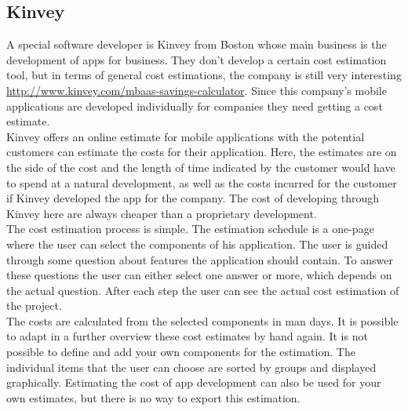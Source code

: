 \subsection{Kinvey}

A special software developer is Kinvey from Boston whose main business is the development of apps for business. They don't develop a certain cost estimation tool, but in terms of general cost estimations, the company is still very interesting \url{http://www.kinvey.com/mbaas-savings-calculator}. Since this company's mobile applications are developed individually for companies they need getting a cost estimate.
\\
Kinvey offers an online estimate for mobile applications with the potential customers can estimate the costs for their application. Here, the estimates are on the side of the cost and the length of time indicated by the customer would have to spend at a natural development, as well as the costs incurred for the customer if Kinvey developed the app for the company. The cost of developing through Kinvey here are always cheaper than a proprietary development.
\\
The cost estimation process is simple. The estimation schedule is a one-page where the user can select the components of his application. The user is guided through some question about features the application should contain. To answer these questions the user can either select one answer or more, which depends on the actual question. After each step the user can see the actual cost estimation of the project.
\\
The costs are calculated from the selected components in man days. It is possible to adapt in a further overview these cost estimates by hand again. It is not possible to define and add your own components for the estimation. The individual items that the user can choose are sorted by groups and displayed graphically. Estimating the cost of app development can also be used for your own estimates, but there is no way to export this estimation.
